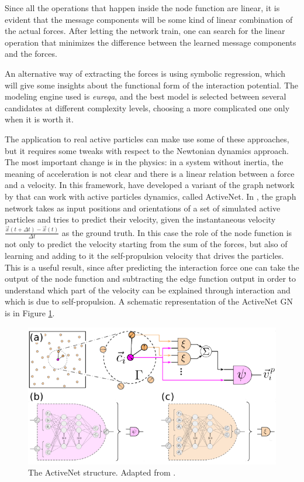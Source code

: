 \documentclass[../../master_thesis_np.tex]{subfiles}
\begin{document}
	Since all the operations that happen inside the node function are linear, it is evident that the message components will be some kind of linear combination of the actual forces. 
	After letting the network train, one can search for the linear operation that minimizes the difference between the learned message components and the forces. 
	
	An alternative way of extracting the forces is using symbolic regression, which will give some insights about the functional form of the interaction potential. 
	The modeling engine used is \emph{eureqa}, and the best model is selected between several candidates at different complexity levels, choosing a more complicated one only when it is worth it.
	
	The application to real active particles can make use some of these approaches, but it requires some tweaks with respect to the Newtonian dynamics approach. 
	The most important change is in the physics: in a system without inertia, the meaning of acceleration is not clear and there is a linear relation between a force and a velocity. 
	In this framework, \citeauthor{ruiz-garcia_discovering_2024} have developed a variant of the graph network by \citeauthor{cranmer_discovering_2020} that can work with active particles dynamics, called ActiveNet. 
	In \cite{ruiz-garcia_discovering_2024}, the graph network takes as input positions and orientations of a set of simulated active particles and tries to predict their velocity, given the instantaneous velocity $\frac{\vec{x}(t + \Delta t) - \vec{x}(t)}{\Delta t}$ as the ground truth. 
	In this case the role of the node function is not only to predict the velocity starting from the sum of the forces, but also of learning and adding to it the self-propulsion velocity that drives the particles. 
	This is a useful result, since after predicting the interaction force one can take the output of the node function and subtracting the edge function output in order to understand which part of the velocity can be explained through interaction and which is due to self-propulsion.
	A schematic representation of the ActiveNet GN is in Figure \ref{fig:ruiz1}.
	\begin{figure}[htp]
		\centering
		\includegraphics[width=\singfigwidth]{ruiz1.png}
		\caption{The ActiveNet structure. Adapted from \cite{ruiz-garcia_discovering_2024}.}
		\label{fig:ruiz1}
	\end{figure}
\end{document}
